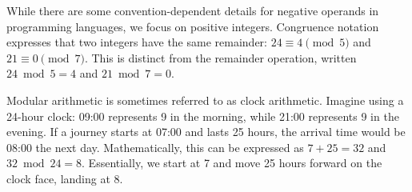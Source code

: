 While there are some convention-dependent details for negative operands in programming languages, we focus on positive integers. Congruence notation expresses that two integers have the same remainder: $24\equiv4\pmod 5$ and $21\equiv0\pmod 7$. This is distinct from the remainder operation, written $24\bmod5=4$ and $21\bmod7=0$.

Modular arithmetic is sometimes referred to as clock arithmetic. Imagine using a 24-hour clock: 09:00 represents 9 in the morning, while 21:00 represents 9 in the evening. If a journey starts at 07:00 and lasts 25 hours, the arrival time would be 08:00 the next day. Mathematically, this can be expressed as \(7 + 25 = 32\) and \(32 \bmod 24 = 8\). Essentially, we start at 7 and move 25 hours forward on the clock face, landing at 8.
